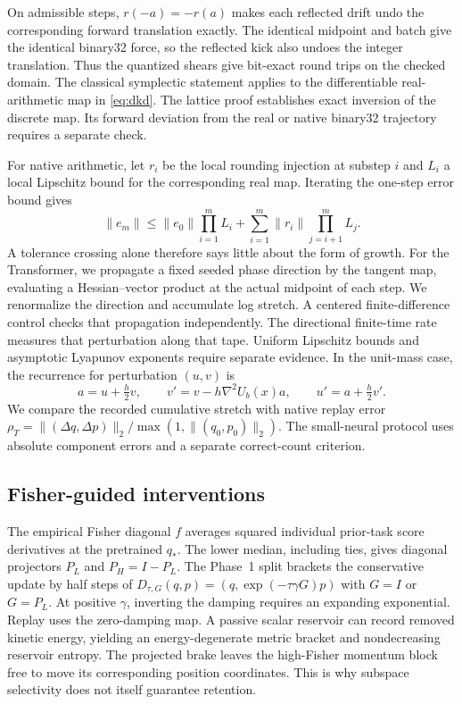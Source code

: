 On admissible steps, \(r(-a)=-r(a)\) makes each reflected drift undo
the corresponding forward translation exactly. The identical midpoint
and batch give the identical binary32 force, so the reflected
kick also undoes the integer translation. Thus the quantized shears
give bit-exact round trips on the checked domain. The classical
symplectic statement applies to the differentiable real-arithmetic
map in \eqref{eq:dkd}. The lattice proof establishes exact inversion
of the discrete map. Its forward deviation from the real or native
binary32 trajectory requires a separate check.

For native arithmetic, let \(r_i\) be the local rounding injection at
substep \(i\) and \(L_i\) a local Lipschitz bound for the corresponding
real map. Iterating the one-step error bound gives
\begin{equation}
 \|e_m\|\le \|e_0\|\prod_{i=1}^{m}L_i
  +\sum_{i=1}^{m}\|r_i\|\prod_{j=i+1}^{m}L_j .
 \label{eq:error}
\end{equation}
A tolerance crossing alone therefore says little about the form of
growth. For the Transformer, we propagate a fixed seeded phase
direction by the tangent map, evaluating a Hessian--vector product
at the actual midpoint of each step. We renormalize the direction
and accumulate log stretch. A centered finite-difference control
checks that propagation independently. The directional finite-time
rate measures that perturbation along that tape. Uniform Lipschitz
bounds and asymptotic Lyapunov exponents require separate evidence.
In the unit-mass case, the recurrence for perturbation \((u,v)\) is
\[
 a=u+\tfrac h2v,\qquad
 v'=v-h\nabla^2 U_b(x)a,\qquad u'=a+\tfrac h2v' .
\]
We compare the recorded cumulative stretch with native replay
error \(\rho_T=\|(\Delta q,\Delta p)\|_2/
\max(1,\|(q_0,p_0)\|_2)\). The small-neural protocol uses
absolute component errors and a separate correct-count criterion.

\subsection{Fisher-guided interventions}

The empirical Fisher diagonal \(f\) averages squared individual
prior-task score derivatives at the pretrained \(q_*\). The
lower median, including ties, gives diagonal projectors \(P_L\)
and \(P_H=I-P_L\). The Phase~1 split brackets the conservative
update by half steps of \(D_{\tau,G}(q,p)=(q,\exp(-\tau\gamma G)p)\)
with \(G=I\) or \(G=P_L\). At positive \(\gamma\), inverting
the damping requires an expanding exponential. Replay uses
the zero-damping map. A passive scalar reservoir can record
removed kinetic energy, yielding an energy-degenerate metric
bracket and nondecreasing reservoir entropy. The projected brake
leaves the high-Fisher momentum block free to move its corresponding
position coordinates. This is why
subspace selectivity does not itself guarantee retention.


